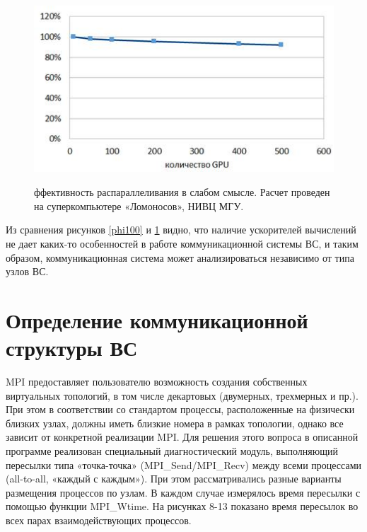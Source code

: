         \begin{figure}[htb]
        	\begin{center}
        		\includegraphics[height=7cm,keepaspectratio]{images/lomonosov_gpu500.jpg}
        	\end{center}
        	\caption{ффективность распараллеливания в слабом смысле. Расчет проведен на суперкомпьютере «Ломоносов», НИВЦ МГУ.}
        	\label{gpu500}
        \end{figure}
        
        Из сравнения рисунков \ref{phi100} и \ref{gpu500} видно, что наличие ускорителей вычислений не дает каких-то особенностей в работе коммуникационной системы ВС, и таким образом, коммуникационная система может анализироваться независимо от типа узлов ВС.
          
        
        
        
        
        
        
        \section{Определение коммуникационной структуры ВС}
        
        MPI предоставляет пользователю возможность создания собственных виртуальных топологий, в том числе декартовых (двумерных, трехмерных  и пр.). При этом в соответствии со стандартом процессы, расположенные на физически близких узлах, должны иметь близкие номера в рамках топологии, однако все зависит от конкретной реализации MPI.  
        Для решения этого вопроса в описанной программе реализован специальный диагностический модуль, выполняющий пересылки типа «точка-точка» (MPI\_Send/MPI_Recv) между всеми процессами (all-to-all, «каждый с каждым»). При этом рассматривались разные варианты размещения процессов по узлам. В каждом случае измерялось время пересылки с помощью функции MPI_Wtime. На рисунках 8-13 показано время пересылок во всех парах взаимодействующих процессов.
        
